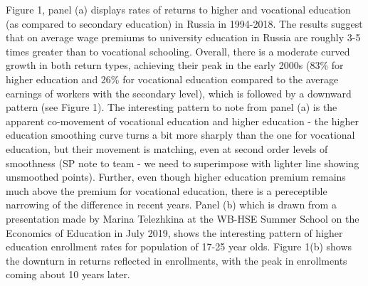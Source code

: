 \documentclass[12pt,a4paper]{article}
\numberwithin{equation}{section}
\begin{document}
Figure 1, panel (a) displays rates of returns to higher and vocational education (as compared to secondary education) in Russia in 1994-2018. The results suggest that on average wage premiums to university education in Russia are roughly 3-5 times greater than to vocational schooling. Overall, there is a moderate curved growth in both return types, achieving their peak in the early 2000s (83\% for higher education and 26\% for vocational education compared to the average earnings of workers with the secondary level), which is followed by a downward pattern (see Figure 1). The interesting pattern to note from panel (a) is the apparent co-movement of vocational education and higher education - the higher education smoothing curve turns a bit more sharply than the one for vocational education, but their movement is matching, even at second order levels of smoothness (SP note to team - we need to superimpose with lighter line showing unsmoothed points). Further, even though higher education premium remains much above the premium for vocational education, there is a pereceptible narrowing of the difference in recent years. Panel (b) which is drawn from a presentation made by Marina Telezhkina at the WB-HSE Summer School on the Economics of Education in July 2019, shows the interesting pattern of higher education enrollment rates for population of 17-25 year olds. Figure 1(b) shows the downturn in returns reflected in enrollments, with the peak in enrollments coming about 10 years later. 
\\
\end{document}
